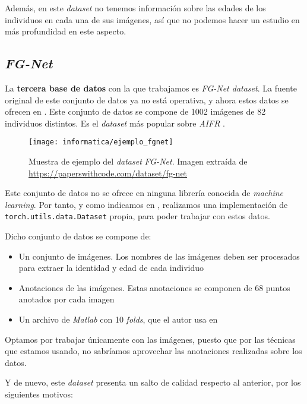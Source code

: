 Además, en este \textit{dataset} no tenemos información sobre las edades de los individuos en cada una de sus imágenes, así que no podemos hacer un estudio en más profundidad en este aspecto.

\subsection{\textit{FG-Net}}

La \textbf{tercera base de datos} con la que trabajamos es \textit{FG-Net dataset}. La fuente original de este conjunto de datos ya no está operativa, y ahora estos datos se ofrecen en \cite{informatica:fgnet_dataset}. Este conjunto de datos se compone de 1002 imágenes de 82 individuos distintos. Es el \textit{dataset} más popular sobre \textit{AIFR} \cite{informatica:best_fgnet_model}.

\begin{figure}[H]
    \centering
    \texttt{[image: informatica/ejemplo\_fgnet]}
    \caption{Muestra de ejemplo del \textit{dataset} \textit{FG-Net}. Imagen extraída de \url{https://paperswithcode.com/dataset/fg-net}}
\end{figure}

Este conjunto de datos no se ofrece en ninguna librería conocida de \textit{machine learning}. Por tanto, y como indicamos en , realizamos una implementación de \lstinline{torch.utils.data.Dataset} propia, para poder trabajar con estos datos.

Dicho conjunto de datos se compone de:

\begin{itemize}
    \item Un conjunto de imágenes. Los nombres de las imágenes deben ser procesados para extraer la identidad y edad de cada individuo
    \item Anotaciones de las imágenes. Estas anotaciones se componen de 68 puntos anotados por cada imagen
    \item Un archivo de \textit{Matlab} con 10 \textit{folds}, que el autor usa en \cite{informatica:yanweifu_work}
\end{itemize}

Optamos por trabajar únicamente con las imágenes, puesto que por las técnicas que estamos usando, no sabríamos aprovechar las anotaciones realizadas sobre los datos.

Y de nuevo, este \textit{dataset} presenta un salto de calidad respecto al anterior, por los siguientes motivos:

